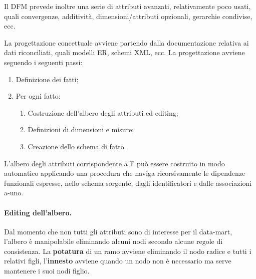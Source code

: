 \documentclass[a4paper, 10pt]{article}
\begin{document}
	Il DFM prevede inoltre una serie di attributi avanzati, relativamente poco usati, quali convergenze, additività, dimensioni/attributi opzionali, gerarchie condivise, ecc.
	
	La progettazione concettuale avviene partendo dalla documentazione relativa ai dati riconciliati, quali modelli ER, schemi XML, ecc. La progettazione avviene seguendo i seguenti passi: \begin{enumerate}
		\item Definizione dei fatti;
		\item Per ogni fatto: \begin{enumerate}
			\item Costruzione dell'albero degli attributi ed editing;
			\item Definizioni di dimensioni e misure;
			\item Creazione dello schema di fatto.
		\end{enumerate}
	\end{enumerate}
	
	L’albero degli attributi corrispondente a F può essere costruito in modo automatico applicando una procedura che naviga ricorsivamente le dipendenze funzionali espresse, nello schema sorgente, dagli identificatori e dalle associazioni a-uno.
	
	\paragraph{Editing dell'albero.} Dal momento che non tutti gli attributi sono di interesse per il data-mart, l'albero è manipolabile eliminando alcuni nodi secondo alcune regole di consistenza. La \textbf{potatura} di un ramo avviene eliminando il nodo radice e tutti i relativi figli, l'\textbf{innesto} avviene quando un nodo non è necessario ma serve mantenere i suoi nodi figlio.


	
	
	
	
	
	
	
	
	
	
	
\end{document}
